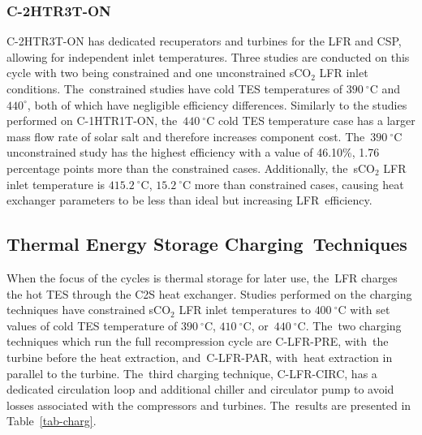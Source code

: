 \documentclass[sustainability,article,accept,moreauthors,pdftex]{Definitions/mdpi}
\begin{document}
\begin{paracol}{2}
\subsubsection{C-2HTR3T-ON}
C-2HTR3T-ON has dedicated recuperators and turbines for the LFR and CSP, allowing for independent inlet temperatures. Three studies are conducted on this cycle with two being constrained and one unconstrained sCO$_2$ LFR inlet conditions. The~constrained studies have cold TES temperatures of $390~^{\circ}$C and $440^{\circ}$, both of which have negligible efficiency differences. Similarly to the studies performed on C-1HTR1T-ON, the~$440~^{\circ}$C cold TES temperature case has a larger mass flow rate of solar salt and therefore increases component cost. The~$390~^{\circ}$C unconstrained study has the highest efficiency with a value of 46.10\%, 1.76 percentage points more than the constrained cases. Additionally, the~sCO$_2$ LFR inlet temperature is $415.2~^{\circ}$C, $15.2~^{\circ}$C more than constrained cases, causing heat exchanger parameters to be less than ideal but increasing LFR~efficiency.

\subsection{Thermal Energy Storage Charging~Techniques}

When the focus of the cycles is thermal storage for later use, the~LFR charges the hot TES through the C2S heat exchanger. Studies performed on the charging techniques have constrained sCO$_2$ LFR inlet temperatures to $400~^{\circ}$C with set values of cold TES temperature of $390~^{\circ}$C, $410~^{\circ}$C, or~$440~^{\circ}$C. The~two charging techniques which run the full recompression cycle are C-LFR-PRE, with~the turbine before the heat extraction, and~C-LFR-PAR, with~heat extraction in parallel to the turbine. The~third charging technique, C-LFR-CIRC, has a dedicated circulation loop and additional chiller and circulator pump to avoid losses associated with the compressors and turbines. The~results are presented in Table~\ref{tab-charg}.  




\end{paracol}
\end{document}
